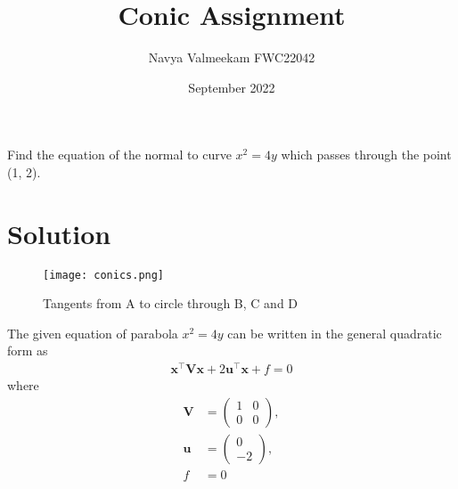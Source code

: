 \documentclass[journal,10pt,twocolumn]{article}
\title{\textbf{Conic Assignment}}
\author{Navya Valmeekam \hspace{9cm} FWC22042}
\date{September 2022}
\let\vec\mathbf
\newcommand{\myvec}[1]{\ensuremath{\begin{pmatrix}#1\end{pmatrix}}}
\begin{document}
\maketitle
Find the equation of the normal to curve $x^2 = 4y$ which passes through the point
(1, 2).
\section*{\large Solution}

\begin{figure}[H]
\centering
\texttt{[image: conics.png]} 
\caption{Tangents from A to circle through B, C and D}
\label{fig:triangle}
\end{figure}

The given equation of parabola $x^2 = 4y$ can be written in the general quadratic form as
\begin{align}
    \label{eq:conic_quad_form}
    \vec{x}^{\top}\vec{V}\vec{x}+2\vec{u}^{\top}\vec{x}+f=0
    \end{align}
where
\begin{align}
	\label{eq:V_matrix}
	\vec{V} &= \myvec{1 & 0\\0 & 0},
	\\
	\label{eq:u_vector}
	\vec{u} &= \myvec{0\\-2},
	\\
	\label{eq:f_value}
	f &= 0
\end{align}
\end{document}
